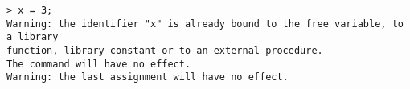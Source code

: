 \begin{center}\begin{minipage}{15cm}\begin{Verbatim}[frame=single]
> x = 3;
Warning: the identifier "x" is already bound to the free variable, to a library 
function, library constant or to an external procedure.
The command will have no effect.
Warning: the last assignment will have no effect.
\end{Verbatim}
\end{minipage}\end{center}
